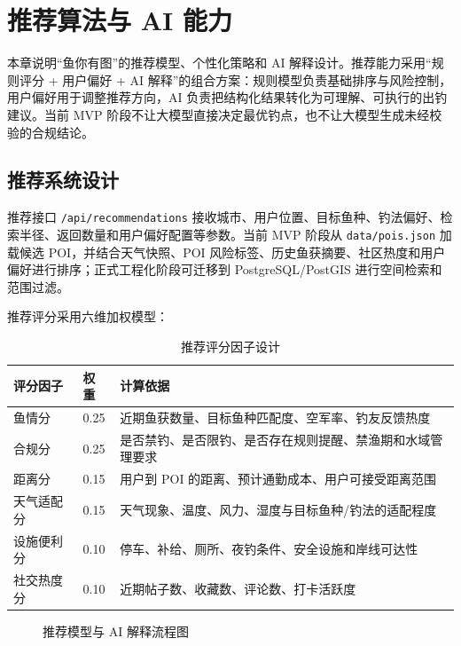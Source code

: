 ﻿\section{推荐算法与 AI 能力}

本章说明“鱼你有图”的推荐模型、个性化策略和 AI 解释设计。推荐能力采用“规则评分 + 用户偏好 + AI 解释”的组合方案：规则模型负责基础排序与风险控制，用户偏好用于调整推荐方向，AI 负责把结构化结果转化为可理解、可执行的出钓建议。当前 MVP 阶段不让大模型直接决定最优钓点，也不让大模型生成未经校验的合规结论。

\subsection{推荐系统设计}

推荐接口 \texttt{/api/recommendations} 接收城市、用户位置、目标鱼种、钓法偏好、检索半径、返回数量和用户偏好配置等参数。当前 MVP 阶段从 \texttt{data/pois.json} 加载候选 POI，并结合天气快照、POI 风险标签、历史鱼获摘要、社区热度和用户偏好进行排序；正式工程化阶段可迁移到 PostgreSQL/PostGIS 进行空间检索和范围过滤。

推荐评分采用六维加权模型：

\begin{table}[H]
  \centering
  \caption{推荐评分因子设计}
  \label{tab:recommend-score}
  \begin{tabularx}{\textwidth}{p{3cm}|p{2cm}|X}
    \toprule
    \textbf{评分因子} & \textbf{权重} & \textbf{计算依据} \\
    \midrule
    鱼情分 & 0.25 & 近期鱼获数量、目标鱼种匹配度、空军率、钓友反馈热度 \\
    \hline
    合规分 & 0.25 & 是否禁钓、是否限钓、是否存在规则提醒、禁渔期和水域管理要求 \\
    \hline
    距离分 & 0.15 & 用户到 POI 的距离、预计通勤成本、用户可接受距离范围 \\
    \hline
    天气适配分 & 0.15 & 天气现象、温度、风力、湿度与目标鱼种/钓法的适配程度 \\
    \hline
    设施便利分 & 0.10 & 停车、补给、厕所、夜钓条件、安全设施和岸线可达性 \\
    \hline
    社交热度分 & 0.10 & 近期帖子数、收藏数、评论数、打卡活跃度 \\
    \bottomrule
  \end{tabularx}
\end{table}

\begin{figure}[H]
  \centering
  \caption{推荐模型与 AI 解释流程图}
  \label{fig:recommendation-flow}
\end{figure}

